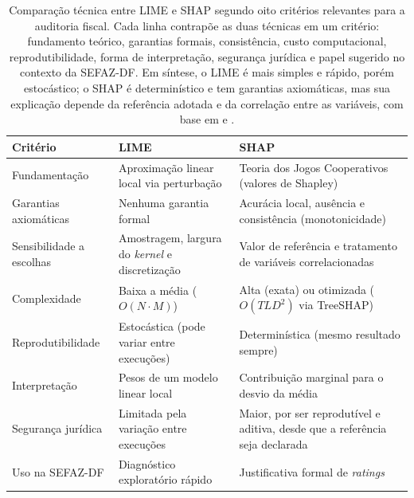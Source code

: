 \begin{table}[H]
    \centering
    \caption[Comparação técnica entre LIME e SHAP]{Comparação técnica entre LIME e SHAP segundo oito critérios relevantes para a auditoria fiscal. Cada linha contrapõe as duas técnicas em um critério: fundamento teórico, garantias formais, consistência, custo computacional, reprodutibilidade, forma de interpretação, segurança jurídica e papel sugerido no contexto da SEFAZ-DF. Em síntese, o LIME é mais simples e rápido, porém estocástico; o SHAP é determinístico e tem garantias axiomáticas, mas sua explicação depende da referência adotada e da correlação entre as variáveis, com base em  e .}
    \label{tab:shap_vs_lime}
    \small
    \renewcommand{\arraystretch}{1.2}
    \begin{tabularx}{\textwidth}{>{\raggedright\arraybackslash}p{3.4cm}LL}
        \toprule
        \textbf{Critério} & \textbf{LIME} & \textbf{SHAP} \\
        \midrule
        Fundamentação & Aproximação linear local via perturbação & Teoria dos Jogos Cooperativos (valores de Shapley) \\
        Garantias axiomáticas & Nenhuma garantia formal & Acurácia local, ausência e consistência (monotonicidade) \\
        Sensibilidade a escolhas & Amostragem, largura do \textit{kernel} e discretização & Valor de referência e tratamento de variáveis correlacionadas \\
        Complexidade & Baixa a média ($O(N \cdot M)$) & Alta (exata) ou otimizada ($O(TLD^2)$ via TreeSHAP) \\
        Reprodutibilidade & Estocástica (pode variar entre execuções) & Determinística (mesmo resultado sempre) \\
        Interpretação & Pesos de um modelo linear local & Contribuição marginal para o desvio da média \\
        Segurança jurídica & Limitada pela variação entre execuções & Maior, por ser reprodutível e aditiva, desde que a referência seja declarada \\
        Uso na SEFAZ-DF & Diagnóstico exploratório rápido & Justificativa formal de \textit{ratings} \\
        \bottomrule
    \end{tabularx}
\end{table}


